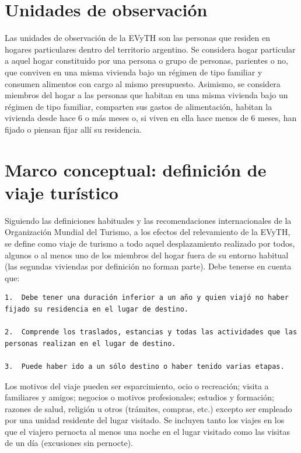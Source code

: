 \documentclass[
  openany]{book}
\begin{document}
\hypertarget{unidades-de-observaciuxf3n}{%
\section{Unidades de observación}\label{unidades-de-observaciuxf3n}}

Las unidades de observación de la EVyTH son las personas que residen en hogares particulares dentro del territorio argentino. Se considera hogar particular a aquel hogar constituido por una persona o grupo de personas, parientes o no, que conviven en una misma vivienda bajo un régimen de tipo familiar y consumen alimentos con cargo al mismo presupuesto. Asimismo, se considera miembros del hogar a las personas que habitan en una misma vivienda bajo un régimen de tipo familiar, comparten sus gastos de alimentación, habitan la vivienda desde hace 6 o más meses o, si viven en ella hace menos de 6 meses, han fijado o piensan fijar allí su residencia.

\hypertarget{marco-conceptual-definiciuxf3n-de-viaje-turuxedstico}{%
\section{Marco conceptual: definición de viaje turístico}\label{marco-conceptual-definiciuxf3n-de-viaje-turuxedstico}}

Siguiendo las definiciones habituales y las recomendaciones internacionales de la Organización Mundial del Turismo, a los efectos del relevamiento de la EVyTH, se define como viaje de turismo a todo aquel desplazamiento realizado por todos, algunos o al menos uno de los miembros del hogar fuera de su entorno habitual (las segundas viviendas por definición no forman parte). Debe tenerse en cuenta que:

\begin{verbatim}
1.  Debe tener una duración inferior a un año y quien viajó no haber fijado su residencia en el lugar de destino.

2.  Comprende los traslados, estancias y todas las actividades que las personas realizan en el lugar de destino.

3.  Puede haber ido a un sólo destino o haber tenido varias etapas.
\end{verbatim}

Los motivos del viaje pueden ser esparcimiento, ocio o recreación; visita a familiares y amigos; negocios o motivos profesionales; estudios y formación; razones de salud, religión u otros (trámites, compras, etc.) excepto ser empleado por una unidad residente del lugar visitado. Se incluyen tanto los viajes en los que el viajero pernocta al menos una noche en el lugar visitado como las visitas de un día (excusiones sin pernocte).
\end{document}
